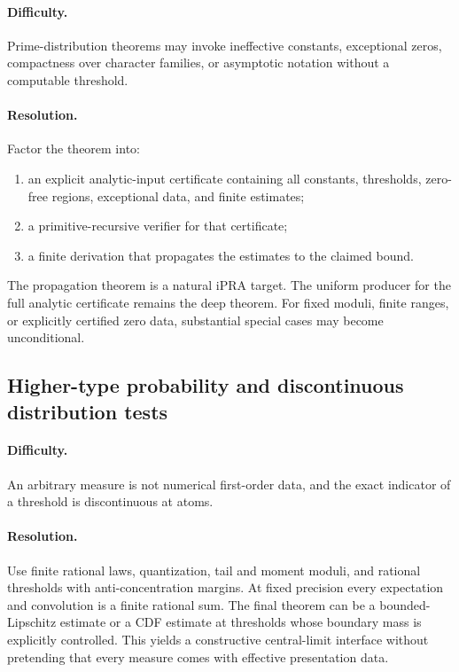 \paragraph{Difficulty.}
Prime-distribution theorems may invoke ineffective constants, exceptional zeros, compactness over character families, or asymptotic notation without a computable threshold.

\paragraph{Resolution.}
Factor the theorem into:

\begin{enumerate}
  \item an explicit analytic-input certificate containing all constants, thresholds, zero-free regions, exceptional data, and finite estimates;
  \item a primitive-recursive verifier for that certificate;
  \item a finite derivation that propagates the estimates to the claimed bound.
\end{enumerate}

The propagation theorem is a natural iPRA target.  The uniform producer for the full analytic certificate remains the deep theorem.  For fixed moduli, finite ranges, or explicitly certified zero data, substantial special cases may become unconditional.

\subsection{Higher-type probability and discontinuous distribution tests}

\paragraph{Difficulty.}
An arbitrary measure is not numerical first-order data, and the exact indicator of a threshold is discontinuous at atoms.

\paragraph{Resolution.}
Use finite rational laws, quantization, tail and moment moduli, and rational thresholds with anti-concentration margins.  At fixed precision every expectation and convolution is a finite rational sum.  The final theorem can be a bounded-Lipschitz estimate or a CDF estimate at thresholds whose boundary mass is explicitly controlled.  This yields a constructive central-limit interface without pretending that every measure comes with effective presentation data.

